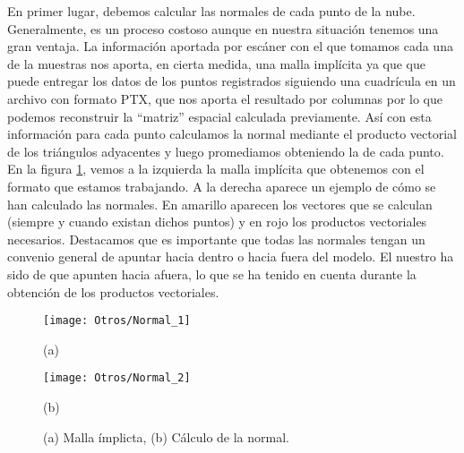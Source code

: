 En primer lugar, debemos calcular las normales de cada punto de la nube. Generalmente, es un proceso costoso aunque en nuestra  situación tenemos una gran ventaja. La información aportada por escáner con el que tomamos cada una de la muestras nos aporta, en cierta medida, una malla implícita ya que que puede entregar los datos de los puntos registrados siguiendo una cuadrícula en un archivo con formato PTX, que nos aporta el resultado por columnas por lo que podemos reconstruir la ``matriz'' espacial calculada previamente. Así con esta información para cada punto calculamos la normal mediante el producto vectorial de los triángulos adyacentes y luego promediamos obteniendo la de cada punto. En la figura \ref{Malla}, vemos a la izquierda la malla implícita que obtenemos con el formato que estamos trabajando. A la derecha aparece un ejemplo de cómo se han calculado las normales. En amarillo aparecen los vectores que se calculan (siempre y cuando existan dichos puntos) y en rojo los productos vectoriales necesarios. Destacamos que es importante que todas las normales tengan un convenio general de apuntar hacia dentro o hacia fuera del modelo. El nuestro ha sido de que apunten hacia afuera, lo que se ha tenido en cuenta durante la obtención de los productos vectoriales. \\

\begin{figure}[h!]
	
	\begin{minipage}{0.5\textwidth}
		\centering
		\texttt{[image: Otros/Normal\_1]} 
		\caption*{(a)}
	\end{minipage}
	\begin{minipage}{0.5\textwidth}
		\texttt{[image: Otros/Normal\_2]}
		\caption*{(b)}
	\end{minipage}
	\caption{(a) Malla ímplicta, (b) Cálculo de la normal.}
	\label{Malla}
\end{figure}


